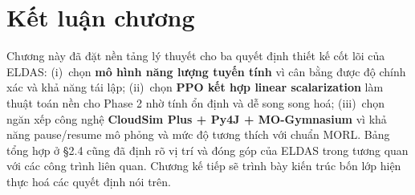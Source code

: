 \section{Kết luận chương}
\label{sec:ket-luan-c2}

Chương này đã đặt nền tảng lý thuyết cho ba quyết định thiết kế cốt lõi
của ELDAS: (i)~chọn \textbf{mô hình năng lượng tuyến tính} vì cân bằng
được độ chính xác và khả năng tái lập; (ii)~chọn \textbf{PPO kết hợp
linear scalarization} làm thuật toán nền cho Phase 2 nhờ tính ổn định
và dễ song song hoá; (iii)~chọn ngăn xếp công nghệ \textbf{CloudSim
Plus + Py4J + MO-Gymnasium} vì khả năng pause/resume mô phỏng và mức
độ tương thích với chuẩn MORL. Bảng tổng hợp ở §2.4 cũng đã định rõ vị
trí và đóng góp của ELDAS trong tương quan với các công trình liên
quan. Chương kế tiếp sẽ trình bày kiến trúc bốn lớp hiện thực hoá các
quyết định nói trên.
